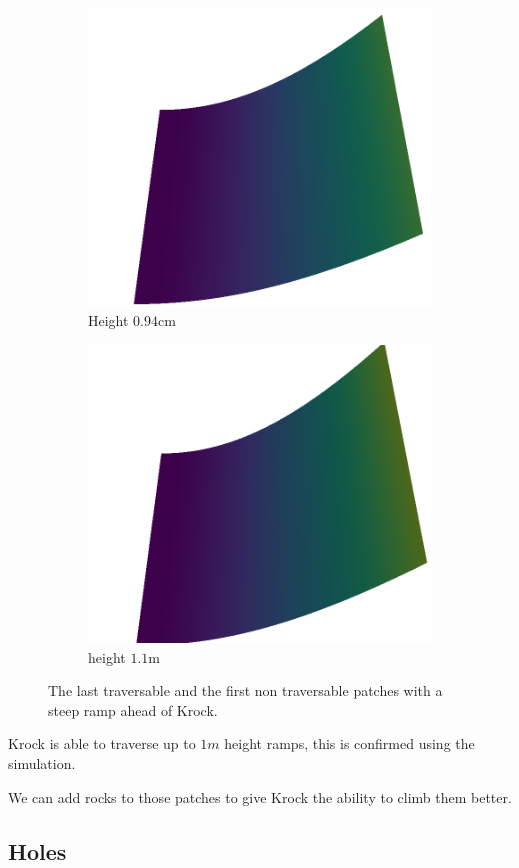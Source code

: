 \begin{figure}[H]
\begin{subfigure}[b]{0.33\textwidth}
    \end{subfigure}   
    \begin{subfigure}[b]{0.33\textwidth}
        \includegraphics[width=\linewidth]{../img/5/custom_patches/ramp/ramp-6-3d.png}
    \caption{Height $0.94$cm}
    \end{subfigure}   
    \begin{subfigure}[b]{0.33\textwidth}
        \includegraphics[width=\linewidth]{../img/5/custom_patches/ramp/ramp-7-3d}
        \caption{height $1.1$m}
    \end{subfigure}   
\caption{The last traversable and the first non traversable patches with a steep ramp ahead of Krock.}    
\end{figure}
Krock is able to traverse up to $1m$ height ramps, this is confirmed using the simulation.

We can add rocks to those patches to give Krock the ability to climb them better. 

\subsection{Holes}
